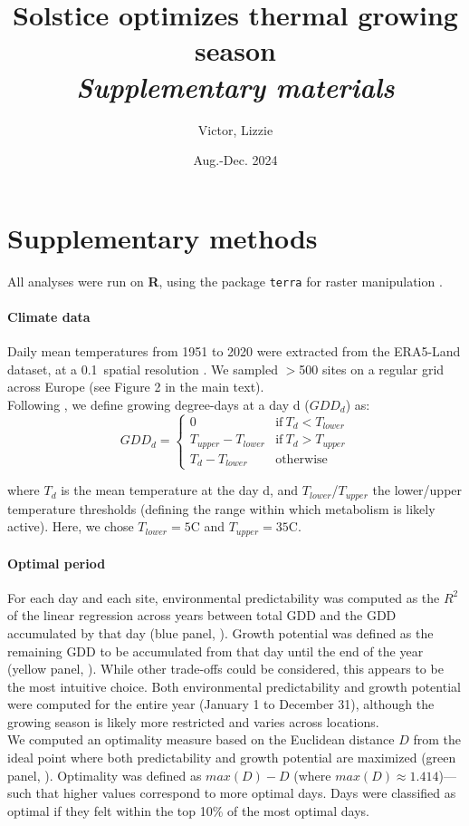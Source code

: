 \documentclass[11pt,letter]{article}
\title{Solstice optimizes thermal growing season\\\emph{Supplementary materials}}
\author{Victor, Lizzie}
\date{Aug.-Dec. 2024}
\begin{document}
\maketitle

\section*{Supplementary methods}

All analyses were run on \textbf{\textsf{R}}, using the package \texttt{terra} for raster manipulation \citep{Hijmans2024}.

\paragraph{Climate data}
Daily mean temperatures from 1951 to 2020 were extracted from the ERA5-Land dataset, at a 0.1\degree~spatial resolution \citep{MunozSabater2021}. We sampled $>$500 sites on a regular grid across Europe (see Figure 2 in the main text).\\
Following \citet{McMaster1997}, we define growing degree-days at a day d ($GDD_d$) as:
\begin{equation}
GDD_d =
\begin{cases}
    0 & \text{if}~T_d<T_{lower}\\
    T_{upper}-T_{lower} & \text{if}~T_d>T_{upper}\\
    T_d-T_{lower} & \text{otherwise}
\end{cases}       
\end{equation}

\noindent where $T_d$ is the mean temperature at the day d, and $T_{lower}$/$T_{upper}$ the lower/upper temperature thresholds (defining the range within which metabolism is likely active). Here, we chose $T_{lower}=5$\degree C and $T_{upper}=35$\degree C. 

\paragraph{Optimal period} For each day and each site, environmental predictability was computed as the $R^2$ of the linear regression across years between total GDD and the GDD accumulated by that day (blue panel, ). Growth potential was defined as the remaining GDD to be accumulated from that day until the end of the year (yellow panel, ). While other trade-offs could be considered, this appears to be the most intuitive choice. Both environmental predictability and growth potential were computed for the entire year (January 1 to December 31), although the growing season is likely more restricted and varies across locations. \\
We computed an optimality measure based on the Euclidean distance $D$ from  the ideal point where both predictability and growth potential are maximized (green panel, ). Optimality was defined as $max(D)-D$ (where $max(D)\approx1.414$)---such that higher values correspond to more optimal days. Days were classified as optimal if they felt within the top 10\% of the most optimal days.
\end{document}
